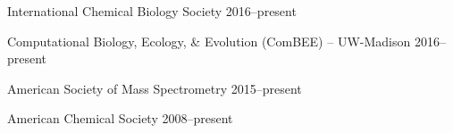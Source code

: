 



\begin{cvhonors}

  \cvhonor
    {International Chemical Biology Society} %
    {} %
    {2016--present} %
    
  \cvhonor
    {Computational Biology, Ecology, \& Evolution (ComBEE) -- UW-Madison} %
    {} %
    {2016--present} %

  \cvhonor
    {American Society of Mass Spectrometry} %
    {} %
    {2015--present} %

  \cvhonor
    {American Chemical Society} %
    {} %
    {2008--present} %


\end{cvhonors}